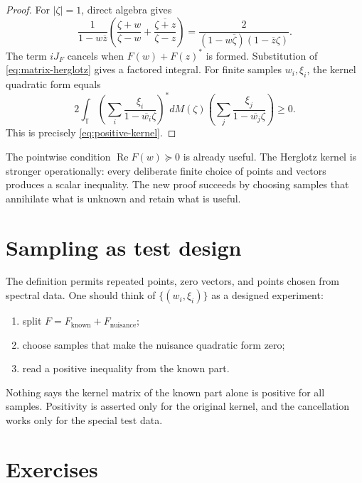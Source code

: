 \documentclass[11pt,oneside,openany]{book}
\theoremstyle{definition}
\theoremstyle{remark}
\newcommand{\Torus}{\mathbb T}
\newcommand{\RePart}{\operatorname{Re}}
\begin{document}
\begin{proof}
For \(|\zeta|=1\), direct algebra gives
\begin{equation}
 \frac{1}{1-w\overline z}
 \left(
   \frac{\zeta+w}{\zeta-w}
   +\overline{\frac{\zeta+z}{\zeta-z}}
 \right)
 =
 \frac{2}{(1-w\overline\zeta)(1-\overline z\zeta)}.
 \label{eq:herglotz-factor}
\end{equation}
The term \(iJ_F\) cancels when \(F(w)+F(z)^*\) is formed.
Substitution of \eqref{eq:matrix-herglotz} gives a factored integral.
For finite samples \(w_i,\xi_i\), the kernel quadratic form equals
\[
  2\int_{\Torus}
  \left(\sum_i\frac{\xi_i}{1-\overline{w_i}\zeta}\right)^*
  dM(\zeta)
  \left(\sum_j\frac{\xi_j}{1-\overline{w_j}\zeta}\right)
  \geq0.
\]
This is precisely \eqref{eq:positive-kernel}.
\end{proof}

\begin{intuitionbox}
The pointwise condition \(\RePart F(w)\succeq0\) is already useful.
The Herglotz kernel is stronger operationally: every deliberate finite
choice of points and vectors produces a scalar inequality.  The new
proof succeeds by choosing samples that annihilate what is unknown and
retain what is useful.
\end{intuitionbox}

\section{Sampling as test design}

The definition permits repeated points, zero vectors, and points
chosen from spectral data.  One should think of
\(\{(w_i,\xi_i)\}\) as a designed experiment:
\begin{enumerate}
  \item split \(F=F_{\mathrm{known}}+F_{\mathrm{nuisance}}\);
  \item choose samples that make the nuisance quadratic form zero;
  \item read a positive inequality from the known part.
\end{enumerate}
Nothing says the kernel matrix of the known part alone is positive for
all samples.  Positivity is asserted only for the original kernel, and
the cancellation works only for the special test data.

\section{Exercises}
\end{document}
